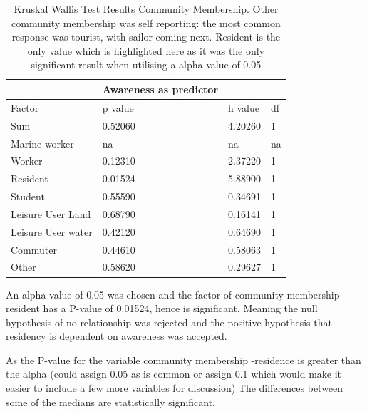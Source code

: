 \begin{table}[H]
    \centering
    \begin{tabular}{|l|l|l|l|}
    \hline
         ~ &Awareness as predictor & ~ & ~ \\ \hline
        Factor & p value & h value & df \\ \hline
        Sum & 0.52060 & 4.20260 & 1 \\ \hline
        Marine worker & na & na & na \\ \hline
        Worker & 0.12310 & 2.37220 & 1 \\ \hline
        Resident & \cellcolor[HTML]{7df9ff} 0.01524 & 5.88900 & 1 \\ \hline
        Student & 0.55590 & 0.34691 & 1 \\ \hline
        Leisure User Land & 0.68790 & 0.16141 & 1 \\ \hline
        Leisure User water & 0.42120 & 0.64690 & 1 \\ \hline
        Commuter & 0.44610 & 0.58063 & 1 \\ \hline
        Other & 0.58620 & 0.29627 & 1 \\ \hline
    \end{tabular}
    \caption{Kruskal Wallis Test Results Community Membership. Other community membership was self reporting: the most common response was tourist, with sailor coming next. Resident is the only value which is highlighted here as it was the only significant result when utilising a alpha value of 0.05}
    \label{Kruskal_wallis_test_general}
\end{table}

An alpha value of 0.05 was chosen and the factor of community membership - resident has a P-value of 0.01524, hence is significant. Meaning the null hypothesis of no relationship was rejected and the positive hypothesis that residency is dependent on awareness was accepted. 




As the P-value for the variable community membership -residence is greater than the alpha (could assign 0.05 as is common or assign 0.1 which would make it easier to include a few more variables for discussion) The differences between some of the medians are statistically significant.

